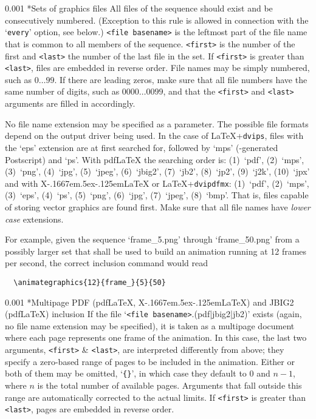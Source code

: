 \documentclass[a4paper]{article}
\makeatletter
\newcommand\myparagraph{\@startsection{paragraph}{3}{\z@}%
                                     {\parskip}%
                                     {0.001\parskip}%
                                     {\itshape\normalsize}}
\def\XeLaTeX{X\kern-.1667em\lower.5ex\hbox{\reflectbox{E}}\kern-.125em\LaTeX}
\makeatother
\begin{document}
\myparagraph*{Sets of graphics files}
All files of the sequence should exist and be consecutively numbered. (Exception to this rule is allowed in connection with the `\verb+every+' option, see below.) {\tt <file base\-name>} is the leftmost part of the file name that is common to all members of the sequence. \verb+<first>+ is the number of the first and \verb+<last>+ the number of the last file in the set. If \verb+<first>+ is greater than \verb+<last>+, files are embedded in reverse order. File names may be simply numbered, such as $0\dots99$. If there are leading zeros, make sure that all file numbers have the same number of digits, such as $0000\dots0099$, and that the \verb+<first>+ and \verb+<last>+ arguments are filled in accordingly.

No file name extension may be specified as a parameter. The possible file formats depend on the output driver being used. In the case of \LaTeX{}+\verb+dvips+, files with the `eps' extension are at first searched for, followed by `mps' (\MP-generated Postscript) and `ps'. With pdf\LaTeX{} the searching order is: (1)~`pdf', (2)~`mps', (3)~`png', (4)~`jpg', (5)~`jpeg', (6)~`jbig2', (7)~`jb2', (8)~`jp2'\footnotemark[1], (9)~`j2k'\footnotemark[1], (10)~`jpx'\footnotemark[1] and with \XeLaTeX{} or \LaTeX{}+\verb+dvipdfmx+: (1)~`pdf', (2)~`mps', (3)~`eps', (4)~`ps', (5)~`png', (6)~`jpg', (7)~`jpeg', (8)~`bmp'. That is, files capable of storing vector graphics are found first. Make sure that all file names have \emph{lower case} extensions.

For example, given the sequence `frame\_5.png' through `frame\_50.png' from a possibly larger set that shall be used to build an animation running at 12 frames per second, the correct inclusion command would read
\begin{verbatim}
  \animategraphics{12}{frame_}{5}{50}
\end{verbatim}

\myparagraph*{Multipage PDF {\rm(pdf\LaTeX, \XeLaTeX)} and JBIG2 {\rm(pdf\LaTeX)} inclusion}
If the file `\verb+<file basename>+.(pdf|jbig2|jb2)' exists (again, no file name extension may be specified), it is taken as a multipage document where each page represents one frame of the animation. In this case, the last two arguments, \verb+<first>+ \& \verb+<last>+, are interpreted differently from above; they specify a zero-based range of pages to be included in the animation. Either or both of them may be omitted, `\verb+{}+', in which case they default to $0$ and $n-1$, where $n$ is the total number of available pages. Arguments that fall outside this range are automatically corrected to the actual limits. If \verb+<first>+ is greater than \verb+<last>+, pages are embedded in reverse order.
\end{document}
